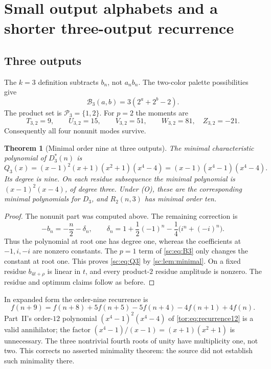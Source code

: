\documentclass[11pt,a4paper]{article}
\numberwithin{equation}{section}
\newtheorem{theorem}{Theorem}[section]
\theoremstyle{definition}
\theoremstyle{remark}
\newcommand{\Bip}{\mathcal B}
\begin{document}
\section{Small output alphabets and a shorter three-output recurrence}\label{sc:sec:small}

\subsection{Three outputs}
The $k=3$ definition subtracts $b_n$, not $a_nb_n$. The two-color palette
possibilities give
\begin{equation}\label{sc:eq:B3}
 \Bip_3(a,b)=3(2^a+2^b-2).
\end{equation}
The product set is $\mathcal P_3=\{1,2\}$. For $p=2$ the moments are
\[
 T_{3,2}=9,\qquad U_{3,2}=15,\qquad V_{3,2}=51,
 \qquad W_{3,2}=81,\quad Z_{3,2}=-21.
\]
Consequently all four nonunit modes survive.

\begin{theorem}[Minimal order nine at three outputs]\label{sc:thm:three}
The minimal characteristic polynomial of $D_3^*(n)$ is
\begin{equation}\label{sc:eq:Q3}
 Q_3(x)=(x-1)^2(x+1)(x^2+1)(x^4-4)
       =(x-1)(x^4-1)(x^4-4).
\end{equation}
Its degree is nine. On each residue subsequence the minimal polynomial is
$(x-1)^2(x-4)$, of degree three. Under (O), these are the corresponding
minimal polynomials for $D_3$, and $R_2(n,3)$ has minimal order ten.
\end{theorem}
\begin{proof}
The nonunit part was computed above. The remaining correction is
\begin{equation}\label{sc:eq:deltaFourier}
 -b_n=-\frac n2-\delta_n,
 \qquad
 \delta_n=1+\frac12(-1)^n-\frac14\bigl(i^n+(-i)^n\bigr).
\end{equation}
Thus the polynomial at root one has degree one, whereas the coefficients
at $-1,i,-i$ are nonzero constants. The $p=1$ term of \eqref{sc:eq:B3} only
changes the constant at root one. This proves \eqref{sc:eq:Q3} by
\cref{sc:lem:minimal}. On a fixed residue $b_{4t+\rho}$ is linear in $t$,
and every product-$2$ residue amplitude is nonzero. The residue and optimum
claims follow as before.
\end{proof}

In expanded form the order-nine recurrence is
\begin{equation}\label{sc:eq:rec3}
 f(n+9)=f(n+8)+5f(n+5)-5f(n+4)-4f(n+1)+4f(n).
\end{equation}
Part~II's order-$12$ polynomial
$(x^4-1)^2(x^4-4)$ of \eqref{tor:eq:recurrence12} is a valid annihilator; the factor
$(x^4-1)/(x-1)=(x+1)(x^2+1)$ is unnecessary. The three nontrivial fourth
roots of unity have multiplicity one, not two. This corrects no asserted
minimality theorem: the source did not establish such minimality there.
\end{document}
